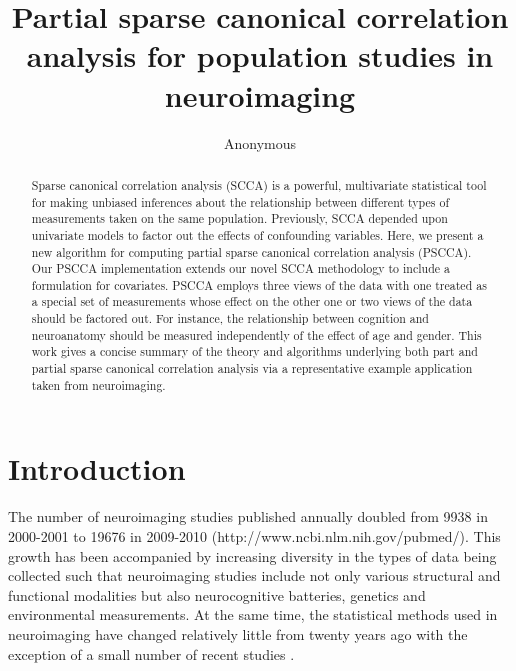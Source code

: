 \documentclass{llncs}
\begin{document}
\vspace{-0.1in}
\title{Partial sparse canonical correlation analysis for population
  studies in neuroimaging}
\author{Anonymous}
\maketitle              
\begin{abstract}
Sparse canonical correlation analysis (SCCA) is a powerful,
multivariate statistical tool for making unbiased inferences about the
relationship between different types of measurements taken on the same
population.  Previously, SCCA depended upon univariate models to
factor out the effects of confounding variables.  Here, we present a
new algorithm for computing partial sparse canonical correlation
analysis (PSCCA).  Our PSCCA implementation extends our novel SCCA
methodology to include a formulation for covariates.  PSCCA employs
three views of the data with one treated as a special set of
measurements whose effect on the other one or two views of the data
should be factored out.  For instance, the relationship between
cognition and neuroanatomy should be measured independently of the
effect of age and gender.  This work gives a concise summary of the
theory and algorithms underlying both part and partial sparse
canonical correlation analysis via a representative example
application taken from neuroimaging.  
\end{abstract}
\section{Introduction}
The number of neuroimaging studies published annually doubled from
9938 in 2000-2001 to 19676 in 2009-2010
(http://www.ncbi.nlm.nih.gov/pubmed/).  This growth has been
accompanied by increasing diversity in the types of data being
collected such that neuroimaging studies include not only various
structural and functional modalities but also neurocognitive
batteries, genetics and environmental measurements.  At the same
time, the statistical methods used in neuroimaging have changed
relatively little from twenty years ago with the exception of a small
number of recent studies \cite{Tosun2010a}.
\end{document}
